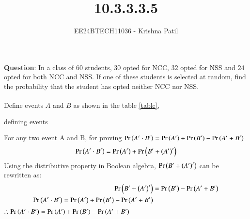 \documentclass[journal]{IEEEtran}
\begin{document}

\vspace{3cm}

\title{10.3.3.3.5}
\author{EE24BTECH11036 - Krishna Patil}
{\let\newpage\relax\maketitle}
\renewcommand{\thefigure}{\theenumi}
\renewcommand{\thetable}{\theenumi}
\setlength{\intextsep}{10pt} %


\textbf{Question}: In a class of $60$ students, $30$ opted for NCC, $32$ opted for NSS and $24$ opted for both NCC and NSS. If one of these students is selected at random, find the probability that the student has opted neither NCC nor NSS. \\ \\
\solution
Define events $A$ and $B$ as shown in the table \ref{table}, \\
\begin{table}[h!]    
  \centering
  
  \caption{defining events}
  \label{table}
\end{table}
\newline For any two event A and B,  for proving $\Pr\left(A^\prime \cdot B^\prime\right) = \Pr\left(A^\prime\right) + \Pr\left(B^\prime\right) - \Pr\left(A^\prime + B^\prime\right)$  \\
\begin{align}
 \Pr\left(A^\prime \cdot B^\prime\right) = \Pr\left(A^\prime\right) + \Pr\left(B^\prime + {\left(A^\prime\right)}^\prime\right) 
\end{align}
Using the distributive property in Boolean algebra, $\Pr\left(B^\prime + {\left(A^\prime\right)}^\prime\right)$ can be rewritten as:
\begin{align}
\Pr\left(B^\prime + {\left(A^\prime\right)}^\prime\right) &= \Pr\left(B^\prime\right) - \Pr\left(A^\prime+B^\prime\right) \\
 \Pr\left(A^\prime \cdot B^\prime\right) = \Pr\left(A^\prime\right) +  \Pr\left(B^\prime\right) - \Pr\left(A^\prime + B^\prime\right)
\end{align}
   \newline $\therefore \Pr\left(A^\prime \cdot B^\prime\right) = \Pr\left(A^\prime\right) +  \Pr\left(B^\prime\right) - \Pr\left(A^\prime + B^\prime\right)$
   
\end{document}
